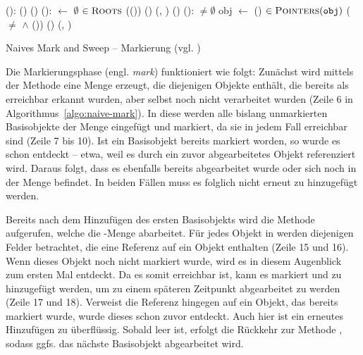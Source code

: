 \begin{algorithm}
\begin{algorithmic}[1]
	\State {}():
	\State \quad {}()
	\State \quad {}()
	\State
	\State {}():
	\State \quad {} $\gets$ $\emptyset$				
	\State \quad \FOREACH {} $\in \textsc{Roots}$		
	\State \quad \quad \IF (())
	\State \quad \quad \quad {}()	
	\State \quad \quad \quad {}(, )	
	\State \quad \quad \quad {}()			
	\State
	\State {}():
	\State \quad \WHILE {} $\neq \emptyset$
	\State \quad \quad obj $\gets$ ()			
	\State \quad \quad \FOREACH {} $\in \textsc{Pointers}(\texttt{obj})$	
	\State \quad \quad \quad \IF ( $\neq$ \Null $\wedge$ ())	
	\State \quad \quad \quad \quad {}()	
	\State \quad \quad \quad \quad {}(, )
\end{algorithmic}
\caption[Naives Mark and Sweep -- Markierung]{Naives Mark and Sweep -- Markierung (vgl. \cite[Kap. 2.2]{jones-lins})}
\label{algo:naive-mark}
\end{algorithm}

Die Markierungsphase (engl. \textit{mark}) funktioniert wie folgt:
Zunächst wird mittels der Methode  eine Menge  erzeugt, die diejenigen Objekte enthält, die bereits als erreichbar erkannt wurden, aber selbst noch nicht verarbeitet wurden (Zeile 6 in Algorithmus~\ref{algo:naive-mark}).
In diese werden alle bislang unmarkierten Basisobjekte der Menge \Roots eingefügt und markiert, da sie in jedem Fall erreichbar sind (Zeile 7 bis 10).
Ist ein Basisobjekt bereits markiert worden, so wurde es schon entdeckt -- etwa, weil es durch ein zuvor abgearbeitetes Objekt referenziert wird.
Daraus folgt, dass es ebenfalls bereits abgearbeitet wurde oder sich noch in der Menge  befindet.
In beiden Fällen muss es folglich nicht erneut zu  hinzugefügt werden.

Bereits nach dem Hinzufügen des ersten Basisobjekts wird die Methode  aufgerufen, welche die -Menge abarbeitet.
Für jedes Objekt in  werden diejenigen Felder betrachtet, die eine Referenz auf ein Objekt enthalten (Zeile 15 und 16).
Wenn dieses Objekt noch nicht markiert wurde, wird es in diesem Augenblick zum ersten Mal entdeckt.
Da es somit erreichbar ist, kann es markiert und zu  hinzugefügt werden, um zu einem späteren Zeitpunkt abgearbeitet zu werden (Zeile 17 und 18).
Verweist die Referenz hingegen auf ein Objekt, das bereits markiert wurde, wurde dieses schon zuvor entdeckt.
Auch hier ist ein erneutes Hinzufügen zu  überflüssig.
Sobald  leer ist, erfolgt die Rückkehr zur Methode , sodass ggfs. das nächste Basisobjekt abgearbeitet wird.

